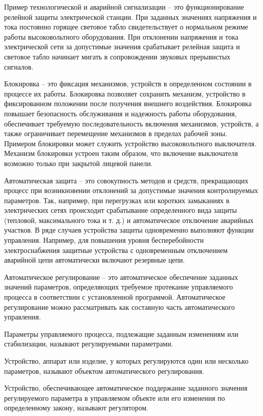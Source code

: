 Пример технологической и аварийной сигнализации -- это функционирование релейной защиты электрической станции. При заданных значениях напряжения и тока постоянно горящее световое табло свидетельствует о нормальном режиме работы высоковольтного оборудования. При отклонении напряжения и тока электрической сети за допустимые значения срабатывает релейная защита и световое табло начинает мигать в сопровождении звуковых прерывистых сигналов.

Блокировка -- это фиксация механизмов, устройств в определенном состоянии в процессе их работы. Блокировка позволяет сохранить механизм, устройство в фиксированном положении после получения внешнего воздействия. Блокировка повышает безопасность обслуживания и надежность работы оборудования, обеспечивает требуемую последовательность включения механизмов, устройств, а также ограничивает перемещение механизмов в пределах рабочей зоны. Примером блокировки может служить устройство высоковольтного выключателя. Механизм блокировки устроен таким образом, что включение выключателя возможно только при закрытой лицевой панели.

Автоматическая защита -- это совокупность методов и средств, прекращающих процесс при возникновении отклонений за допустимые значения контролируемых параметров. Так, например, при перегрузках или коротких замыканиях в электрических сетях происходит срабатывание определенного вида защиты (тепловой, максимального тока и т. д.) и автоматическое отключение аварийных участков. В ряде случаев устройства защиты одновременно выполняют функции управления. Например, для повышения уровня бесперебойности электроснабжения защитные устройства с одновременным отключением аварийной цепи автоматически включают резервные цепи.

Автоматическое регулирование -- это автоматическое обеспечение заданных значений параметров, определяющих требуемое протекание управляемого процесса в соответствии с установленной программой. Автоматическое регулирование можно рассматривать как составную часть автоматического управления.

Параметры управляемого процесса, подлежащие заданным изменениям или стабилизации, называют регулируемыми параметрами.

Устройство, аппарат или изделие, у которых регулируются один или несколько параметров, называют объектом автоматического регулирования.

Устройство, обеспечивающее автоматическое поддержание заданного значения регулируемого параметра в управляемом объекте или его изменения по определенному закону, называют регулятором.

